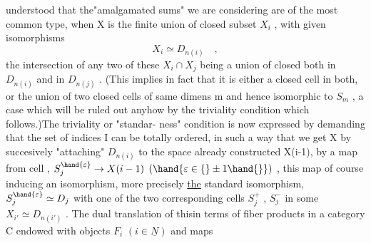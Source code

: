 
understood that the"amalgamated sums" we are considering are of the most
common type,  when X is the finite union of closed subset $X_i$ ,  with
given isomorphisms
\[ X_i \simeq D_{n(i)} \quad , \]
the intersection of any two of these $X_i \cap X_j$ being a union of closed 
both in $D_{n(i)}$ and in $D_{n(j)}$ . (This implies in fact that it is either
 a closed cell in both,  or the union of two closed cells of same dimens
m and hence isomorphic to $S_m$ , a case which will be ruled out anyhow
by the triviality condition  which follows.)The triviality or "standar-%
ness" condition is now expressed by demanding that the set of indices
I can be totally ordered,  in such a way that we get X by succesively
"attaching"  $D_{n(i)}$ to the space already constructed\xout{\unsure{,}} X(i-1), by a
map from  cell , $S_j^{\hand{\varepsilon}} \to X(i-1)$ \quad $(\hand{\varepsilon\in\{}\pm 1\hand{\}})$ , this map of course
inducing an isomorphism,  more precisely \uline{the} standard isomorphism,
$S_j^{\hand{\varepsilon}} \simeq D_j$ \quad with one of the two corresponding cells $S_j^+$ , $S_j^-$ in some
$X_{i'} \simeq D_{n(i')}$ .  The  dual translation of this\hand{,}in terms of fiber
products in  a category C endowed with objects $F_i$ $(i\in\underline{N})$ and maps
